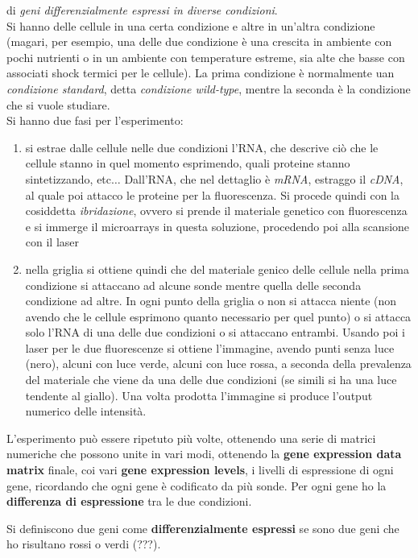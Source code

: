 \documentclass[a4paper,12pt, oneside]{book}
\begin{document}
di \textit{geni differenzialmente espressi in diverse condizioni}.\\
Si hanno delle cellule in una certa condizione e altre in un'altra condizione
(magari, per esempio, una delle due condizione è una crescita in ambiente con
pochi nutrienti o in un ambiente con temperature estreme, sia alte che basse con
associati shock termici per le cellule). La prima condizione è normalmente uan
\textit{condizione standard}, detta \textit{condizione wild-type}, mentre la
seconda è la condizione che si vuole studiare.\\
Si hanno due fasi per l'esperimento:
\begin{enumerate}
  \item si estrae dalle cellule nelle due condizioni l'RNA, che descrive ciò che
  le cellule stanno in quel momento esprimendo, quali proteine stanno
  sintetizzando, etc$\ldots$ Dall'RNA, che nel dettaglio è \textit{mRNA},
  estraggo il \textit{cDNA}, al quale poi attacco le proteine per la
  fluorescenza. Si procede quindi con la cosiddetta \textit{ibridazione}, ovvero
  si prende il materiale genetico con fluorescenza e si immerge il
  microarrays in questa soluzione, procedendo poi alla scansione con il
  laser
  \item nella griglia si ottiene quindi che del materiale genico delle cellule
  nella prima condizione si attaccano ad alcune sonde mentre quella delle
  seconda condizione ad altre. In ogni punto della griglia o non si attacca
  niente (non avendo che le cellule esprimono quanto necessario per quel punto)
  o si attacca solo l'RNA di una delle due condizioni o si attaccano entrambi.
  Usando poi i laser per le due fluorescenze si ottiene l'immagine, avendo punti
  senza luce (nero), alcuni con luce verde, alcuni con luce rossa, a seconda
  della prevalenza del materiale che viene da una delle due condizioni (se
  simili si ha una luce tendente al giallo). Una volta prodotta l'immagine si
  produce l'output numerico delle intensità. 
\end{enumerate}
L'esperimento può essere ripetuto più volte, ottenendo una serie di matrici
numeriche che possono unite in vari modi, ottenendo la \textbf{gene expression
  data matrix} finale, coi vari \textbf{gene expression levels}, i livelli di
espressione di ogni gene, ricordando che ogni gene è codificato da più
sonde. Per ogni gene ho la \textbf{differenza di espressione} tra le due
condizioni.
\begin{definizione}
  Si definiscono due geni come \textbf{differenzialmente espressi} se sono due
  geni che ho risultano rossi o verdi (???).
\end{definizione}
\end{document}
